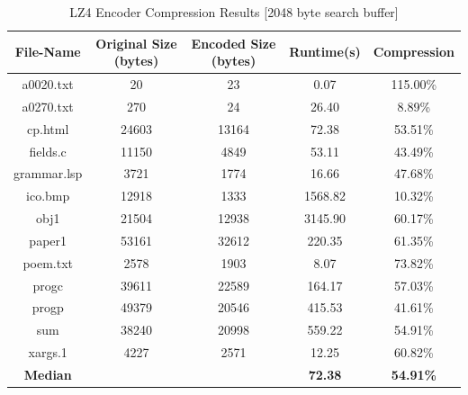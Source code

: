 \documentclass[12pt]{article}
\begin{document}
\begin{table}[H]
	\centering
	\begin{tabular}{| c | c | c | c | c |} 
		\hline
		File-Name & Original Size (bytes) & Encoded Size (bytes) & Runtime(s) & Compression\\
		\hline
		a0020.txt & 20 & 23 & 0.07 & 115.00\%\\\hline
		a0270.txt & 270 & 24 & 26.40 & 8.89\%\\\hline
		cp.html & 24603 & 13164 & 72.38 & 53.51\%\\\hline
		fields.c & 11150 & 4849 & 53.11 & 43.49\%\\\hline
		grammar.lsp & 3721 & 1774 & 16.66 & 47.68\%\\\hline
		ico.bmp & 12918 & 1333 & 1568.82 & 10.32\%\\\hline
		obj1 & 21504 & 12938 & 3145.90 & 60.17\%\\\hline
		paper1 & 53161 & 32612 & 220.35 & 61.35\%\\\hline
		poem.txt & 2578 & 1903 & 8.07 & 73.82\%\\\hline
		progc & 39611 & 22589 & 164.17 & 57.03\%\\\hline
		progp & 49379 & 20546 & 415.53 & 41.61\%\\\hline
		sum & 38240 & 20998 & 559.22 & 54.91\%\\\hline
		xargs.1 & 4227 & 2571 & 12.25 & 60.82\%\\
		\Xhline{3\arrayrulewidth}
		\textbf{Median} & & & \textbf{72.38} & \textbf{54.91\%}\\
		\hline
	\end{tabular}
	\caption{LZ4 Encoder Compression Results [2048 byte search buffer]}
	\label{lz4_enc_results2048}
\end{table}
\end{document}
